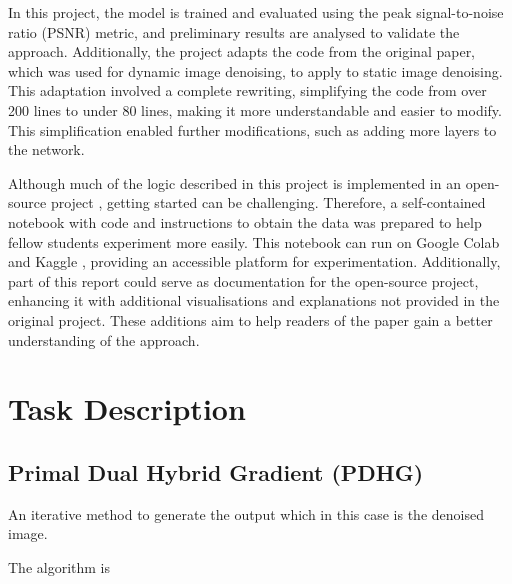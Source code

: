 \documentclass[12pt]{article}
\begin{document}
In this project, the model is trained and evaluated using the peak signal-to-noise ratio (PSNR) metric, and preliminary results are analysed to validate the approach. Additionally, the project adapts the code from the original paper, which was used for dynamic image denoising, to apply to static image denoising. This adaptation involved a complete rewriting, simplifying the code from over 200 lines to under 80 lines, making it more understandable and easier to modify. This simplification enabled further modifications, such as adding more layers to the network.

Although much of the logic described in this project is implemented in an open-source project \cite{kofler2023learning}, getting started can be challenging. Therefore, a self-contained notebook with code and instructions to obtain the data was prepared to help fellow students experiment more easily. This notebook can run on Google Colab \cite{colab} and Kaggle \cite{kaggle}, providing an accessible platform for experimentation. Additionally, part of this report could serve as documentation for the open-source project, enhancing it with additional visualisations and explanations not provided in the original project. These additions aim to help readers of the paper gain a better understanding of the approach.

\section{Task Description}



\subsection{Primal Dual Hybrid Gradient (PDHG)}

An iterative method to generate the output which in this case is the denoised image. 

The algorithm is
\end{document}
